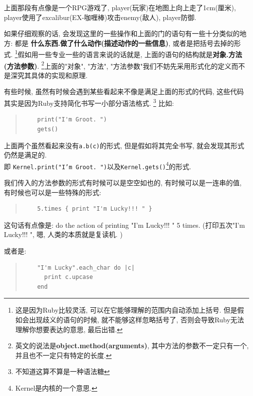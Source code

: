 上面那段有点像是一个RPG游戏了, player(玩家)在地图上向上走了1cm(厘米), player使用了excalibur(EX-咖喱棒)攻击enemy(敌人), player防御. 

如果仔细观察的话, 会发现这里的一些操作和上面的门的语句有一些十分类似的地方: 都是 \textbf{什么东西.做了什么动作(描述动作的一些信息)}, 或者是把括号去掉的形式. \footnote{这是因为Ruby比较灵活, 可以在它能够理解的范围内自动添加上括号. 但是假如会出现歧义的语句的时候, 就不能够这样忽略括号了, 否则会导致Ruby无法理解你想要表达的意思, 最后出错. }假如用一些专业一些的语言来说的话就是, 上面的语句的结构就是\textbf{对象.方法(方法参数)}. \footnote{英文的说法是\textbf{object.method(arguments)}, 其中方法的参数不一定只有一个, 并且也不一定只有特定的长度. }上面的"对象", "方法", "方法参数"我们不妨先采用形式化的定义而不是深究其具体的实现和原理. %

有些时候, 虽然有时候会遇到某些看起来不像是满足上面的形式的代码, 这些代码其实是因为Ruby支持简化书写一小部分语法格式. \footnote{不知道这算不算是一种语法糖} 比如: 

\begin{quotation}
  \begin{verbatim}
    print("I'm Groot. ")
    gets()
  \end{verbatim}
\end{quotation}

上面两个虽然看起来没有\texttt{a.b(c)}的形式, 但是假如将其完全书写, 就会发现其形式仍然是满足的. \\即 \texttt{Kernel.print("I'm Groot. ")}以及\texttt{Kernel.gets()}\footnote{Kernel是内核的一个意思. }的形式. 

我们传入的方法参数的形式有时候可以是空空如也的, 有时候可以是一连串的值, 有时候也可以是一些特殊的形式: 

\begin{quotation}
  \begin{verbatim}
    5.times { print "I'm Lucky!!! " }
  \end{verbatim}
\end{quotation}

这句话有点像是: do the action of printing "I'm Lucky!!! " 5 times. (打印五次"I'm Lucky!!! ", 嗯, 人类的本质就是复读机. )

或者是: 

\begin{quotation}
  \begin{verbatim}
    "I'm Lucky".each_char do |c|
      print c.upcase
    end
  \end{verbatim}
\end{quotation}

